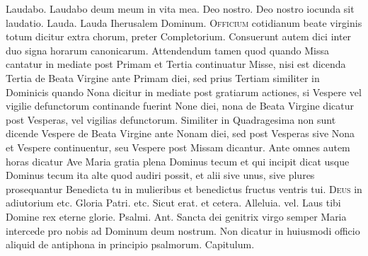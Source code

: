 \begin{multicols*}{2}
 Laudabo.
 Laudabo deum meum in vita mea.
 Deo nostro.
 Deo nostro iocunda sit laudatio.
 Lauda.
 Lauda Iherusalem Dominum.
\color{Red} 
\lettrine[lines=2]{\zallmancaps \color{Blue} O}{fficium} cotidianum beate virginis totum dicitur extra chorum, preter Completorium. Consuerunt autem dici inter duo signa horarum canonicarum. Attendendum tamen quod quando Missa cantatur in mediate post Primam et Tertia continuatur Misse, nisi est dicenda Tertia de Beata Virgine ante Primam diei, sed prius Tertiam similiter in Dominicis quando Nona dicitur in mediate post gratiarum actiones, si Vespere vel vigilie defunctorum continande fuerint None diei, nona de Beata Virgine dicatur post Vesperas, vel vigilias defunctorum. Similiter in Quadragesima non sunt dicende Vespere de Beata Virgine ante Nonam diei, sed post Vesperas sive Nona et Vespere continuentur, seu Vespere post Missam dicantur. Ante omnes autem horas dicatur {\color{black} Ave Maria gratia plena Dominus tecum} et qui incipit dicat usque {\color{black} Dominus tecum} ita alte quod audiri possit, et alii sive unus, sive plures prosequantur {\color{black} Benedicta tu in mulieribus et benedictus fructus ventris tui.} \color{black}
{\color{Red} }
\lettrine[lines=2]{\zallmancaps \color{Red} D}{eus} in adiutorium {\color{Red} etc.} Gloria Patri. {\color{Red} etc.} Sicut erat. {\color{Red} et cetera.} Alleluia. {\color{Red} vel.} Laus tibi Domine rex eterne glorie. {\color{Red} Psalmi.}
{\color{Red} Ant.} Sancta dei genitrix virgo semper Maria intercede pro nobis ad Dominum deum nostrum. {\color{Red} Non dicatur in huiusmodi officio aliquid de antiphona in principio psalmorum. Capitulum.}

\end{multicols*}
